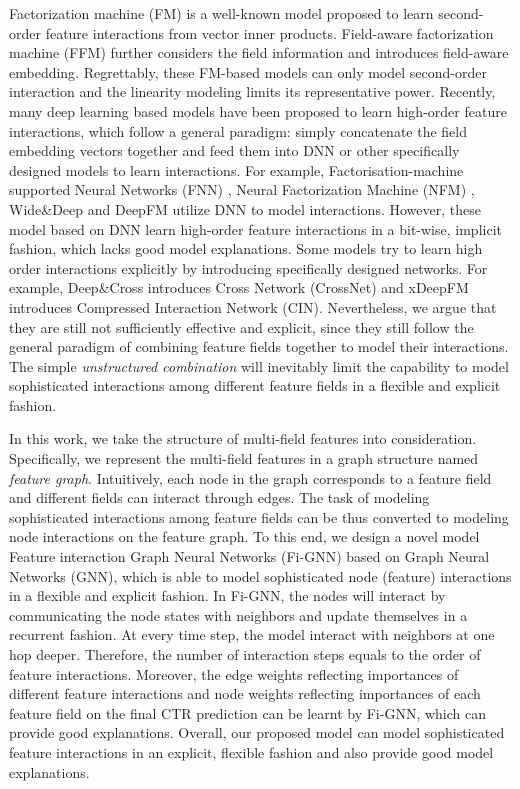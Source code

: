 \documentclass[sigconf]{acmart}
\begin{document}
Factorization machine (FM) \cite{rendle2010factorization} is a well-known model proposed to learn second-order feature interactions from vector inner products. 
Field-aware factorization machine (FFM) \cite{juan2016field} further considers the field information and introduces field-aware embedding.
Regrettably, these FM-based models can only model second-order interaction and the linearity modeling limits its representative power.      
Recently, many deep learning based models have been proposed to learn high-order feature interactions, which follow a general paradigm: simply concatenate the field embedding vectors together and feed them into DNN or other specifically designed models to learn interactions.
For example, Factorisation-machine supported Neural Networks (FNN) \cite{zhang2016deep}, Neural Factorization Machine (NFM) \cite{he2017neural}, Wide\&Deep \cite{cheng2016wide} and DeepFM \cite{guo2017deepfm} utilize DNN to model interactions.
However, these model based on DNN learn high-order feature interactions in a bit-wise, implicit fashion, which lacks good model explanations.
Some models try to learn high order interactions explicitly by introducing specifically designed networks.
For example, Deep\&Cross \cite{wang2017deep} introduces Cross Network (CrossNet) and xDeepFM \cite{lian2018xdeepfm} introduces Compressed Interaction Network (CIN).
Nevertheless, we argue that they are still not sufficiently effective and explicit, since they still follow the general paradigm of combining feature fields together to model their interactions.
The simple \emph{unstructured combination} will inevitably limit the capability to model sophisticated interactions among different feature fields in a flexible and explicit fashion.
 

In this work, we take the structure of multi-field features into consideration.
Specifically, we represent the multi-field features in a graph structure named \emph{feature graph}.
Intuitively, each node in the graph corresponds to a feature field and different fields can interact through edges.
The task of modeling sophisticated interactions among feature fields can be thus converted to modeling node interactions on the feature graph.
To this end, we design a novel model Feature interaction Graph Neural Networks (Fi-GNN) based on Graph Neural Networks (GNN), which is able to model sophisticated node (feature) interactions in a flexible and explicit fashion.
In Fi-GNN, the nodes will interact by communicating the node states with neighbors and update themselves in a recurrent fashion.
At every time step, the model interact with neighbors at one hop deeper.  
Therefore, the number of interaction steps equals to the order of feature interactions.
Moreover, the edge weights reflecting importances of different feature interactions and node weights reflecting importances of each feature field on the final CTR prediction can be learnt by Fi-GNN, which can provide good explanations. 
Overall, our proposed model can model sophisticated feature interactions in an explicit, flexible fashion and also provide good model explanations.
\end{document}
